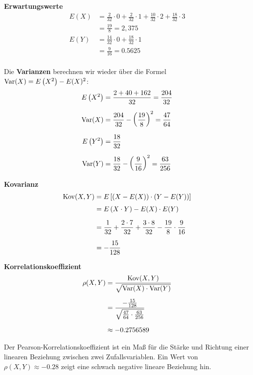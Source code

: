 \documentclass[main.tex]{subfiles}
\begin{document}
\textbf{Erwartungswerte}
$$\begin{aligned}
    E(X) &= \frac{2}{32} \cdot 0 + \frac{2}{32} \cdot 1 + \frac{10}{32} \cdot 2 + \frac{18}{32} \cdot 3 \\[2mm]
    &= \frac{19}{8} = 2,375 \\[4mm]
    E(Y) &= \frac{14}{32} \cdot 0 + \frac{18}{32} \cdot 1 \\[2mm]
    &= \frac{9}{16} = 0.5625 \\
\end{aligned}$$

Die \textbf{Varianzen} berechnen wir wieder über die Formel $\operatorname{Var}(X) = E\left(X^2\right) - E(X)^2$:
$$\begin{aligned}
    E\left(X^2\right) &= \frac{2 + 40 + 162}{32} = \frac{204}{32}\\[2mm]
    \operatorname{Var}(X) &= \frac{204}{32} - \left(\frac{19}{8}\right)^2
    = \frac{47}{64} \\[2mm]
    E\left(Y^2\right) &= \frac{18}{32} \\[2mm]
    \operatorname{Var}(Y) &= \frac{18}{32} - \left(\frac{9}{16}\right)^2
    = \frac{63}{256}
\end{aligned}$$

\textbf{Kovarianz} 
$$\begin{aligned}
\operatorname{Kov}(X, Y) &= E\left[(X-E(X))\cdot(Y-E(Y))\right] \\[1mm]
    &= E\left(X\cdot Y\right) - E(X)\cdot E(Y) \\[2mm]
    &= \frac{1}{32} + \frac{2\cdot 7}{32} + \frac{3\cdot 8}{32} - \frac{19}{8} \cdot \frac{9}{16} \\[2mm]
    &= - \frac{15}{128}
\end{aligned}$$

\textbf{Korrelationskoeffizient}
$$\begin{aligned}
    \rho(X, Y) &= \frac{\operatorname{Kov}(X, Y)}{\sqrt{\operatorname{Var}(X)\cdot \operatorname{Var}(Y)}} \\[2mm]
    &= \frac{- \frac{15}{128}}{\sqrt{\frac{47}{64} \cdot \frac{63}{256}}} \\[2mm]
    &\approx -0.2756589
\end{aligned}$$

Der Pearson-Korrelationskoeffizient ist ein Maß für die Stärke und Richtung einer linearen Beziehung zwischen zwei Zufallsvariablen. Ein Wert von $\rho(X, Y) \approx -0.28$ zeigt eine schwach negative lineare Beziehung hin.
\end{document}
